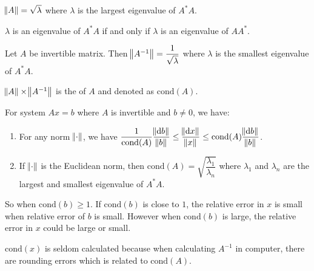 \begin{theorem}
    $\norm{A} = \sqrt{\lambda}$ where $\lambda$ is the largest eigenvalue of $A^* A$.
\end{theorem}

\begin{theorem}
    $\lambda$ is an eigenvalue of $A^* A$ if and only if $\lambda$ is an eigenvalue of $AA^*$.
\end{theorem}

\begin{theorem}
    Let $A$ be invertible matrix. Then $\norm{A^{-1}} = \dfrac{1}{\sqrt{\lambda}}$ where $\lambda$ is the smallest eigenvalue of $A^*A$.
\end{theorem}

\begin{definition}
    $\norm{A} \times \norm{A^{-1}}$ is the  of $A$ and denoted as $\text{cond}(A)$.
\end{definition}

\begin{theorem}
    For system $Ax=b$ where $A$ is invertible and $b \neq 0$, we have:
    \begin{enumerate}
        \item For any norm $\norm{\cdot}$, we have $\dfrac{1}{\text{cond}(A)} \dfrac{\norm{\dif b}}{\norm{b}} \leq \dfrac{\norm{\dif x}}{\norm{x}} \leq \text{cond}(A) \dfrac{\norm{\dif b}}{\norm{b}}$.
        \item If $\norm{\cdot}$ is the Euclidean norm, then $\text{cond}(A) = \sqrt{\dfrac{\lambda_1}{\lambda_n}}$ where $\lambda_1$ and $\lambda_n$ are the largest and smallest eigenvalue of $A^*A$.
    \end{enumerate}
    
    So when $\text{cond} (b) \geq 1$. If $\text{cond}(b)$ is close to $1$, the relative error in $x$ is small when relative error of $b$ is small. However when $\text{cond}(b)$ is large, the relative error in $x$ could be large or small. 
    
    $\text{cond}(x)$ is seldom calculated because when calculating $A^{-1}$ in computer, there are rounding errors which is related to $\text{cond}(A)$.
\end{theorem}


